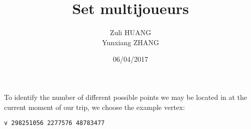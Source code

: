 \documentclass[titlepage,11pt,a4paper]{article}
\title[INF 431 Programming Project]{Set multijoueurs}
\author{Zuli \textsc{HUANG}\\
            Yunxiang \textsc{ZHANG}
            }
\date{06/04/2017}
\begin{document}
\maketitle

\section{}
To identify the number of different possible points we may be located in at the current moment of our trip, we choose the example vertex:
\begin{verbatim}
v 298251056 2277576 48783477
\end{verbatim}
\end{document}
